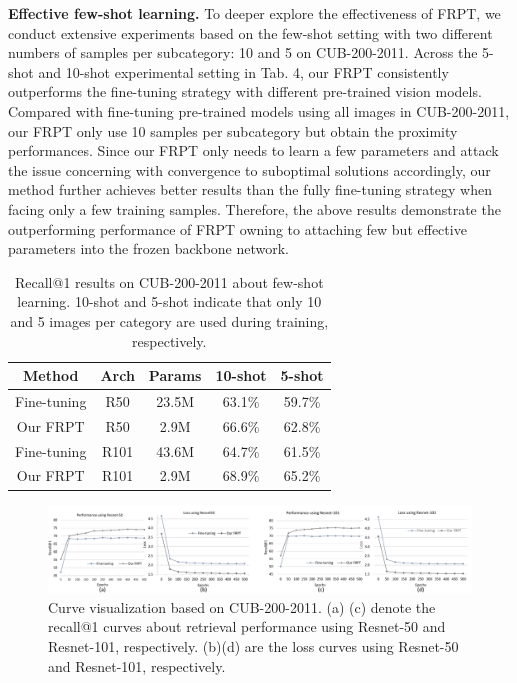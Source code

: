 \documentclass[letterpaper]{article} %
\begin{document}
\textbf{Effective few-shot learning.} To deeper explore the effectiveness of FRPT, we conduct extensive experiments based on the few-shot setting with two different numbers of samples per subcategory: 10 and 5 on CUB-200-2011. Across the 5-shot and 10-shot experimental setting in Tab. 4, our FRPT consistently outperforms the fine-tuning strategy with different pre-trained vision models. Compared with fine-tuning pre-trained models using all images in CUB-200-2011, our FRPT only use 10 samples per subcategory but obtain the proximity performances. Since our FRPT only needs to learn a few parameters and attack the issue concerning with convergence to suboptimal solutions accordingly, our method further achieves better results than the fully fine-tuning strategy when facing only a few training samples. Therefore, the above results demonstrate the outperforming performance of FRPT owning to attaching few but effective parameters into the frozen backbone network.

\begin{table}\centering

\begin{tabular}{c|c|c||c|c}
\hline
\hline
Method & Arch & Params & 10-shot & 5-shot \\
\hline
\hline
Fine-tuning & R50 &  23.5M  & 63.1\% & 59.7\%  \\
Our FRPT & R50 &  2.9M  & 66.6\% &  62.8\%  \\
Fine-tuning & R101 & 43.6M  & 64.7\%  & 61.5\% \\
Our FRPT & R101 & 2.9M & 68.9\% & 65.2\% \\
\hline
\hline

\end{tabular}
\caption{  Recall@1 results on CUB-200-2011 about few-shot learning. 10-shot and 5-shot indicate that only 10 and 5 images per category are used during training, respectively.
}
\end{table}

\begin{figure}[t]
\begin{center}
\includegraphics[width=0.93\linewidth]{vce}
\end{center}
\caption{Curve visualization based on CUB-200-2011. (a) (c) denote the recall@1 curves about retrieval performance using Resnet-50 and Resnet-101, respectively. (b)(d) are the loss curves using Resnet-50 and Resnet-101, respectively.
}

\end{figure}
\end{document}
